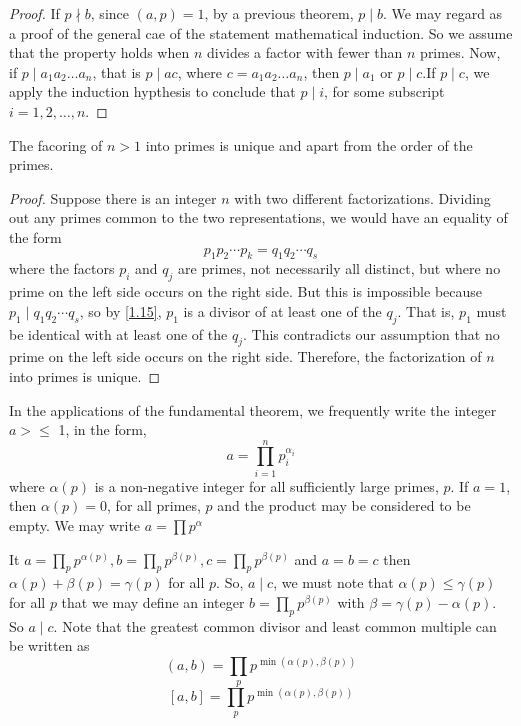 \documentclass[11pt]{article}
\begin{document}
\begin{proof}
    If \(p \nmid b\), since \((a, p) = 1\), by a previous theorem, \(p \mid b\). We may regard as a proof of the general cae of the statement mathematical induction. So we assume that the property holds when \(n\) divides a factor with fewer than \(n\) primes.
    Now, if \(p \mid a_1a_2\ldots a_n\), that is \(p \mid ac\), where \(c = a_1a_2\ldots a_n\), then \(p \mid a_1\) or \(p \mid c\).If \(p \mid c\), we apply the induction hypthesis to conclude that \(p \mid i\), for some subscript \(i = 1, 2, \ldots, n\).
\end{proof}

\begin{theorem}\label{1.16}
    The facoring of \(n > 1\) into primes is unique and apart from the order of the primes.
\end{theorem}

\begin{proof}
    Suppose there is an integer \(n\) with two different factorizations. Dividing out any primes common to the two representations, we would have an equality of the form
    \[
        p_1 p_2 \cdots p_k = q_1 q_2 \cdots q_s
    \]
    where the factors \(p_i\) and \(q_j\) are primes, not necessarily all distinct,
    but where no prime on the left side occurs on the right side. But this is
    impossible because \(p_1 \mid q_1 q_2 \cdots q_s\), so by \cref{1.15},
    \(p_1\) is a divisor of at least one of the \(q_j\). That is, \(p_1\) must be
    identical with at least one of the \(q_j\). This contradicts our assumption
    that no prime on the left side occurs on the right side. Therefore, the
    factorization of \(n\) into primes is unique.
\end{proof}

In the applications of the fundamental theorem, we frequently write the integer
\(a > \leqslant\) 1, in the form,
\[
    a = \prod_{i=1}^{n} p_i^{\alpha_i}
\]
where \(\alpha(p)\) is a non-negative integer for all sufficiently large
primes, \(p\). If \(a = 1\), then \(\alpha(p) = 0\), for all primes, \(p\) and
the product may be considered to be empty. We may write \(a = \prod
p^{\alpha}\)

It \(a = \prod_{p} p^{\alpha(p)}, b = \prod_{p} p^{\beta(p)}, c = \prod_{p}
p^{\beta(p)}\) and \(a = b = c\) then \(\alpha(p) + \beta(p) = \gamma(p)\) for
all \(p\). So, \(a \mid c\), we must note that \(\alpha(p) \leqslant
\gamma(p)\) for all \(p\) that we may define an integer \(b =
\prod_{p}p^{\beta(p)}\) with \(\beta = \gamma(p) - \alpha(p)\). So \(a \mid
c\). Note that the greatest common divisor and least common multiple can be
written as \[(a, b) = \prod_{p} p^{\min(\alpha(p), \beta(p))}\] \[[a, b] = \prod_{p} p^{\min(\alpha(p), \beta(p))}\]
\end{document}
